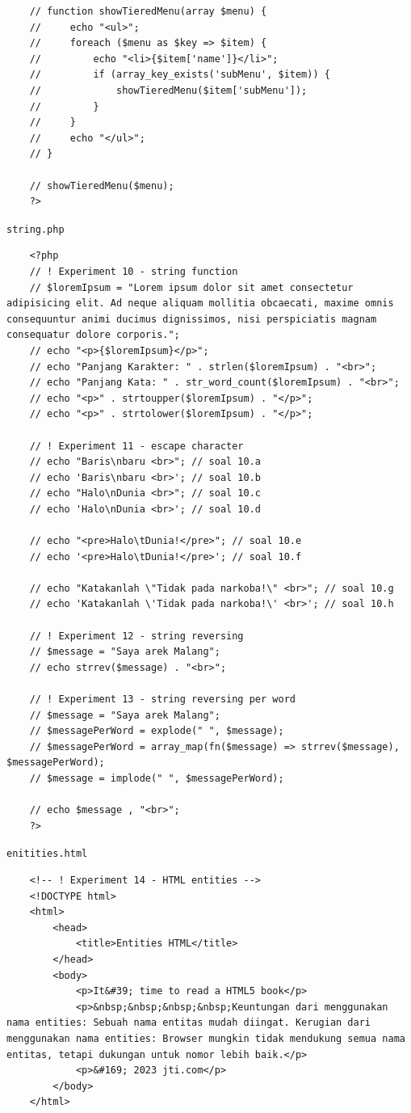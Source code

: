 \documentclass[12pt,titlepage]{article}
\begin{document}
\begin{verbatim}
    // function showTieredMenu(array $menu) {
    //     echo "<ul>";
    //     foreach ($menu as $key => $item) {
    //         echo "<li>{$item['name']}</li>";
    //         if (array_key_exists('subMenu', $item)) {
    //             showTieredMenu($item['subMenu']);
    //         }
    //     }
    //     echo "</ul>";
    // }

    // showTieredMenu($menu);
    ?>
\end{verbatim}

\texttt{string.php}
\begin{verbatim}
    <?php
    // ! Experiment 10 - string function
    // $loremIpsum = "Lorem ipsum dolor sit amet consectetur adipisicing elit. Ad neque aliquam mollitia obcaecati, maxime omnis consequuntur animi ducimus dignissimos, nisi perspiciatis magnam consequatur dolore corporis.";
    // echo "<p>{$loremIpsum}</p>";
    // echo "Panjang Karakter: " . strlen($loremIpsum) . "<br>";
    // echo "Panjang Kata: " . str_word_count($loremIpsum) . "<br>";
    // echo "<p>" . strtoupper($loremIpsum) . "</p>";
    // echo "<p>" . strtolower($loremIpsum) . "</p>";
        
    // ! Experiment 11 - escape character
    // echo "Baris\nbaru <br>"; // soal 10.a
    // echo 'Baris\nbaru <br>'; // soal 10.b
    // echo "Halo\nDunia <br>"; // soal 10.c
    // echo 'Halo\nDunia <br>'; // soal 10.d
        
    // echo "<pre>Halo\tDunia!</pre>"; // soal 10.e
    // echo '<pre>Halo\tDunia!</pre>'; // soal 10.f
        
    // echo "Katakanlah \"Tidak pada narkoba!\" <br>"; // soal 10.g
    // echo 'Katakanlah \'Tidak pada narkoba!\' <br>'; // soal 10.h
        
    // ! Experiment 12 - string reversing
    // $message = "Saya arek Malang";
    // echo strrev($message) . "<br>";
        
    // ! Experiment 13 - string reversing per word
    // $message = "Saya arek Malang";
    // $messagePerWord = explode(" ", $message);
    // $messagePerWord = array_map(fn($message) => strrev($message), $messagePerWord);
    // $message = implode(" ", $messagePerWord);

    // echo $message , "<br>";
    ?>
\end{verbatim}

\texttt{enitities.html}
\begin{verbatim}
    <!-- ! Experiment 14 - HTML entities -->
    <!DOCTYPE html>
    <html>
        <head>
            <title>Entities HTML</title>
        </head>
        <body>
            <p>It&#39; time to read a HTML5 book</p>
            <p>&nbsp;&nbsp;&nbsp;&nbsp;Keuntungan dari menggunakan nama entities: Sebuah nama entitas mudah diingat. Kerugian dari menggunakan nama entities: Browser mungkin tidak mendukung semua nama entitas, tetapi dukungan untuk nomor lebih baik.</p>
            <p>&#169; 2023 jti.com</p>
        </body>
    </html>
\end{verbatim}
\end{document}

